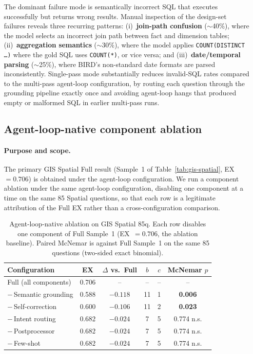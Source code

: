 \documentclass[11pt]{article}
\begin{document}
The dominant failure mode is semantically incorrect SQL that executes successfully but returns wrong results. Manual inspection of the design-set failures reveals three recurring patterns: (i)~\textbf{join-path confusion} ($\sim$40\%), where the model selects an incorrect join path between fact and dimension tables; (ii)~\textbf{aggregation semantics} ($\sim$30\%), where the model applies \texttt{COUNT(DISTINCT \dots)} where the gold SQL uses \texttt{COUNT(*)}, or vice versa; and (iii)~\textbf{date/temporal parsing} ($\sim$25\%), where BIRD's non-standard date formats are parsed inconsistently. Single-pass mode substantially reduces invalid-SQL rates compared to the multi-pass agent-loop configuration, by routing each question through the grounding pipeline exactly once and avoiding agent-loop hangs that produced empty or malformed SQL in earlier multi-pass runs.

\subsection{Agent-loop-native component ablation}
\label{sec:ablation}

\paragraph{Purpose and scope.} The primary GIS Spatial Full result (Sample~1 of Table~\ref{tab:gis-spatial}, EX$=0.706$) is obtained under the agent-loop configuration. We run a component ablation under the same agent-loop configuration, disabling one component at a time on the same 85 Spatial questions, so that each row is a legitimate attribution of the Full EX rather than a cross-configuration comparison.

\begin{table}[t]
\centering
\caption{Agent-loop-native ablation on GIS Spatial 85q. Each row disables one component of Full Sample~1 (EX~$=0.706$, the ablation baseline). Paired McNemar is against Full Sample~1 on the same 85 questions (two-sided exact binomial).}
\label{tab:ablation}
\begin{tabular}{lccccc}
\toprule
Configuration & EX & $\Delta$ vs.\ Full & $b$ & $c$ & McNemar $p$ \\
\midrule
Full (all components)     & 0.706 & --       & --  & --  & -- \\
$-$\,Semantic grounding   & 0.588 & $-0.118$ & 11  & 1   & \textbf{0.006} \\
$-$\,Self-correction      & 0.600 & $-0.106$ & 11  & 2   & \textbf{0.023} \\
$-$\,Intent routing       & 0.682 & $-0.024$ & 7   & 5   & 0.774 n.s. \\
$-$\,Postprocessor        & 0.682 & $-0.024$ & 7   & 5   & 0.774 n.s. \\
$-$\,Few-shot             & 0.682 & $-0.024$ & 7   & 5   & 0.774 n.s. \\
\bottomrule
\end{tabular}
\end{table}
\end{document}
